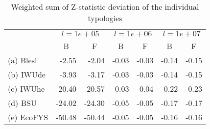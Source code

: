 \begin{table}[htb]
\centering
\caption{Weighted sum of Z-statistic deviation of the individual typologies}
\label{tab:WSZ}
\begin{tabular}{l rr rr rr}
\toprule
 & \multicolumn{2}{c}{$l = 1e+05$}
 & \multicolumn{2}{c}{$l = 1e+06$}
 & \multicolumn{2}{c}{$l = 1e+07$}
 \\
 & \multicolumn{1}{c}{B} & \multicolumn{1}{c}{F} & 
   \multicolumn{1}{c}{B} & \multicolumn{1}{c}{F} & 
   \multicolumn{1}{c}{B} & \multicolumn{1}{c}{F} \\
\midrule

(a) Blesl  &   -2.55 &   -2.04 &  -0.03 &  -0.03 &  -0.14 &  -0.15 \\
(b) IWUde  &   -3.93 &   -3.17 &  -0.03 &  -0.03 &  -0.14 &  -0.15 \\
(c) IWUhe  &  -20.40 &  -20.57 &  -0.03 &  -0.04 &  -0.22 &  -0.23 \\
(d) BSU    &  -24.02 &  -24.30 &  -0.05 &  -0.05 &  -0.17 &  -0.17 \\
(e) EcoFYS &  -50.48 &  -50.44 &  -0.05 &  -0.05 &  -0.16 &  -0.16 \\

\bottomrule
\end{tabular}
\end{table}
